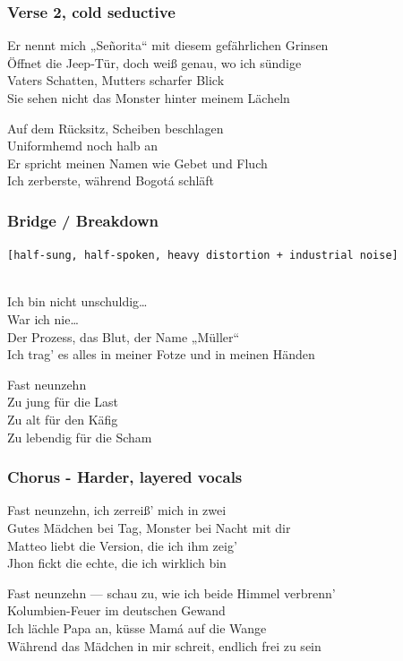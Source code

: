 \subsubsection{Verse 2, cold seductive}\label{verse-2-cold-seductive}

Er nennt mich „Señorita`` mit diesem gefährlichen Grinsen\\
Öffnet die Jeep-Tür, doch weiß genau, wo ich sündige\\
Vaters Schatten, Mutters scharfer Blick\\
Sie sehen nicht das Monster hinter meinem Lächeln

Auf dem Rücksitz, Scheiben beschlagen\\
Uniformhemd noch halb an\\
Er spricht meinen Namen wie Gebet und Fluch\\
Ich zerberste, während Bogotá schläft

\subsubsection{Bridge / Breakdown}\label{bridge-breakdown}

\texttt{{[}half-sung,\ half-spoken,\ heavy\ distortion\ +\ industrial\ noise{]}}\strut \\
Ich bin nicht unschuldig\ldots{}\\
War ich nie\ldots{}\\
Der Prozess, das Blut, der Name „Müller``\\
Ich trag' es alles in meiner Fotze und in meinen Händen

Fast neunzehn\\
Zu jung für die Last\\
Zu alt für den Käfig\\
Zu lebendig für die Scham

\subsubsection{Chorus - Harder, layered
vocals}\label{chorus---harder-layered-vocals}

Fast neunzehn, ich zerreiß' mich in zwei\\
Gutes Mädchen bei Tag, Monster bei Nacht mit dir\\
Matteo liebt die Version, die ich ihm zeig'\\
Jhon fickt die echte, die ich wirklich bin

Fast neunzehn --- schau zu, wie ich beide Himmel verbrenn'\\
Kolumbien-Feuer im deutschen Gewand\\
Ich lächle Papa an, küsse Mamá auf die Wange\\
Während das Mädchen in mir schreit, endlich frei zu sein

